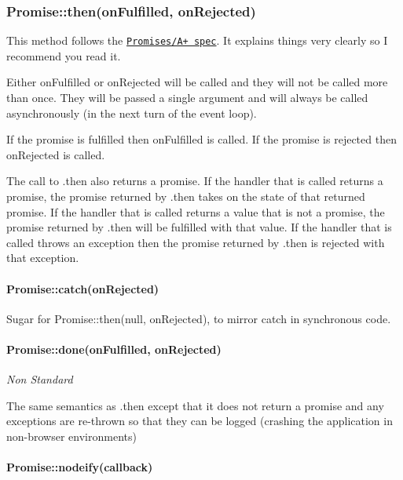 \subsubsection*{Promise\+::then(on\+Fulfilled, on\+Rejected)}

This method follows the \href{http://promises-aplus.github.io/promises-spec/}{\tt Promises/\+A+ spec}. It explains things very clearly so I recommend you read it.

Either {\ttfamily on\+Fulfilled} or {\ttfamily on\+Rejected} will be called and they will not be called more than once. They will be passed a single argument and will always be called asynchronously (in the next turn of the event loop).

If the promise is fulfilled then {\ttfamily on\+Fulfilled} is called. If the promise is rejected then {\ttfamily on\+Rejected} is called.

The call to {\ttfamily .then} also returns a promise. If the handler that is called returns a promise, the promise returned by {\ttfamily .then} takes on the state of that returned promise. If the handler that is called returns a value that is not a promise, the promise returned by {\ttfamily .then} will be fulfilled with that value. If the handler that is called throws an exception then the promise returned by {\ttfamily .then} is rejected with that exception.

\paragraph*{Promise\+::catch(on\+Rejected)}

Sugar for {\ttfamily Promise\+::then(null, on\+Rejected)}, to mirror {\ttfamily catch} in synchronous code.

\paragraph*{Promise\+::done(on\+Fulfilled, on\+Rejected)}

{\itshape Non Standard}

The same semantics as {\ttfamily .then} except that it does not return a promise and any exceptions are re-\/thrown so that they can be logged (crashing the application in non-\/browser environments)

\paragraph*{Promise\+::nodeify(callback)}


